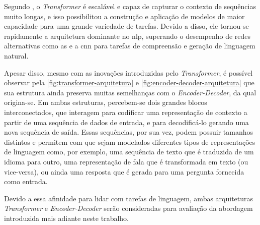 Segundo , o \textit{Transformer} é escalável e capaz de capturar o contexto de sequências muito longas, e isso possibilitou a construção e aplicação de modelos de maior capacidade para uma grande variedade de tarefas. 
Devido a disso, ele tornou-se rapidamente a arquitetura dominante no \acrshort{nlp}, superando o desempenho de redes alternativas como as  e a \acrfull{cnn} para tarefas  de compreensão e geração de linguagem natural.







Apesar disso, mesmo com as inovações introduzidas pelo \textit{Transformer}, é possível observar pela \autoref{fig:transformer-arquitetura} e \autoref{fig:encoder-decoder-arquitetura} que sua estrutura ainda preserva muitas semelhanças com o \textit{Encoder-Decoder}, da qual origina-se.
Em ambas estruturas, percebem-se dois grandes blocos interconectados, que interagem para codificar uma representação de contexto a partir de uma sequência de dados de entrada, e para decodificá-lo gerando uma nova sequência de saída. 
Essas sequências, por sua vez, podem possuir tamanhos distintos e permitem com que sejam modelados diferentes tipos de representações de linguagem como, por exemplo, uma sequência de texto que é traduzida de um idioma para outro, uma representação de fala que é transformada em texto (ou vice-versa), ou ainda uma resposta que é gerada para uma pergunta fornecida como entrada.

Devido a essa afinidade para lidar com tarefas de linguagem, ambas arquiteturas \textit{Transformer} e \textit{Encoder-Decoder} serão consideradas para avaliação da abordagem introduzida mais adiante neste trabalho.


